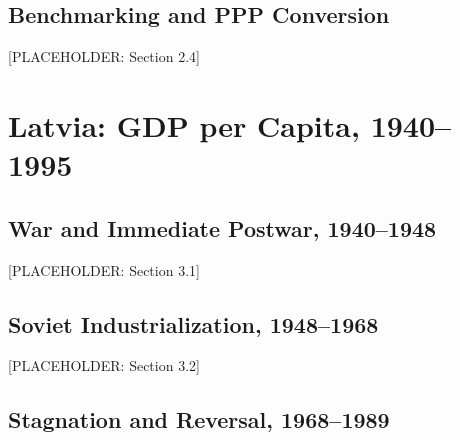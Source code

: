 \documentclass[12pt,a4paper]{article}
\begin{document}
\subsection{Benchmarking and PPP Conversion}
\label{sec:methodology-ppp}

[PLACEHOLDER: Section 2.4]


\section{Latvia: GDP per Capita, 1940--1995}
\label{sec:latvia}

\subsection{War and Immediate Postwar, 1940--1948}
\label{sec:latvia-war}

[PLACEHOLDER: Section 3.1]

\subsection{Soviet Industrialization, 1948--1968}
\label{sec:latvia-industrialization}

[PLACEHOLDER: Section 3.2]

\subsection{Stagnation and Reversal, 1968--1989}
\label{sec:latvia-stagnation}
\end{document}
